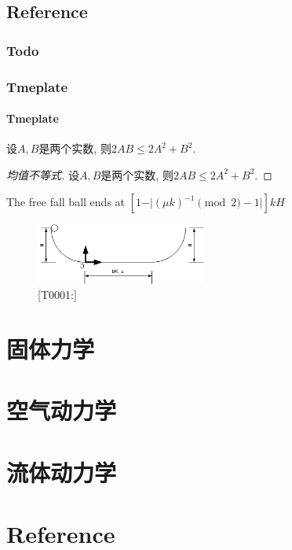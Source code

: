 \documentclass[UTF8]{../06-Physics}
\begin{document}
\section{Reference}

\subsection{Todo}





\subsection{Tmeplate}

\subsubsection{Tmeplate}

\begin{theorem}[均值不等式]

    设$A,B$是两个实数, 则$2AB\leq 2 A^2+B^2$.
    
\end{theorem}

\begin{proof}[均值不等式]

    设$A,B$是两个实数, 则$2AB\leq 2 A^2+B^2$.
    
\end{proof}

The free fall ball ends at $[1-\vert (\mu k)^{-1} \pmod 2 -1 \vert ]kH $

\begin{figure}[h]
    \centering
    \includegraphics[width=0.5\textwidth]{../src/T0001.png}
    \caption{[T0001:]}
    \label{fig:1}
\end{figure}







\chapter{固体力学}
\chapter{空气动力学}
\chapter{流体动力学}




\chapter{Reference}
\end{document}
